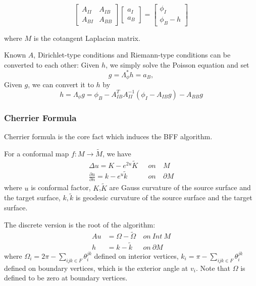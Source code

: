 \begin{equation}
\left[\begin{matrix}
A_{II} & A_{IB}\\
A_{BI} & A_{BB}
\end{matrix}\right] \left[\begin{matrix}
a_I\\
a_B
\end{matrix}\right]
= \left[\begin{matrix}
\phi_I\\
\phi_B - h\end{matrix}\right]
\label{eq:relation}
\end{equation}

where $M$ is the cotangent Laplacian matrix.

Known $A$, Dirichlet-type conditions and Riemann-type conditions can be converted to each other: Given $h$, we simply solve the Poisson equation and set 
\begin{equation}
g = \Lambda^*_\phi h = a_B,
\end{equation}
Given $g$, we can convert it to $h$  by
\begin{equation}
h = \Lambda_\phi g = \phi_B - A_{IB}^TA_{II}^{-1}(\phi_I - A_{IB}g) - A_{BB}g
\end{equation}


\subsubsection{Cherrier Formula}
Cherrier formula \cite{CHERRIER1984154} is the core fact which induces the BFF algorithm. 

For a conformal map $f: M \rightarrow \tilde{M}$, we have 
\begin{equation}
\begin{split}
\Delta u = K - e^{2u} \tilde{K} \ \ \ &on\ &M\,\\
\frac{\partial u}{\partial n} = k - e^{u}\tilde{k} \ \ \ &on\     &\partial M
\end{split}
\end{equation}
where $u$ is conformal factor, $K$,$\tilde{K}$ are Gauss curvature of the source surface and  the target surface, $k, \tilde{k}$ is geodesic curvature of the source surface and the target surface.


The discrete version is the root of the algorithm:
\begin{equation}
\begin{split}
Au &=   \Omega - \tilde\Omega\  &on\  Int\  M\\
h &= k - \tilde{k}\ \  &on\ \partial M 
\end{split}
\label{eq:poisson}
\end{equation}
where $\Omega_i = 2\pi - \sum_{ijk \in F}\theta_i^{jk}$ defined on interior vertices, $k_i = \pi - \sum_{ijk \in F}\theta_i^{jk}$ defined on boundary vertices, which is the exterior angle at $v_i$. Note that $\Omega$ is defined to be zero at boundary vertices.



